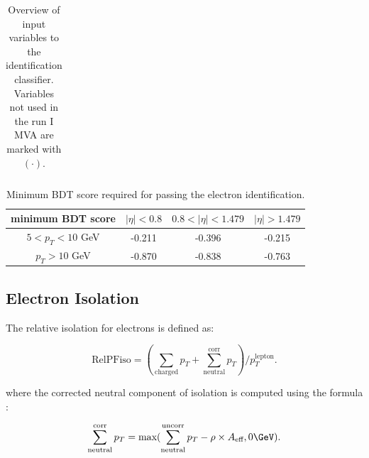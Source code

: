 \begin{table}[h!]
{\begin{tabular}{c|l}
\hline %
\hline %
     \end{tabular}}
    \caption{Overview of input variables to the identification classifier. Variables not used in the run I MVA are marked with  $(\mathord{\cdot})$.}
    \label{tab:ele_ID_input_variables}
\end{table}


\begin{table}[h!]
\scriptsize
    \centering
    \begin{tabular}{c|c c c}
\hline %
minimum BDT score    &  $|\eta| < 0.8 $ & $0.8 < |\eta| < 1.479$ 	& $|\eta| > 1.479$      \\
\hline %
$ 5 < p_T < 10 $ GeV &  -0.211      & -0.396  		& -0.215		\\
$p_T > 10$ GeV       &  -0.870		& -0.838		& -0.763		\\
\hline %
\hline %
     \end{tabular}
\small
    \caption{Minimum BDT score required for passing the electron identification.}
    \label{tab:ele_ID_WP}
\end{table}


\subsection{Electron Isolation}
\label{sec:eleiso}

The relative isolation for electrons is defined as: 

\begin{equation}
\text{RelPFiso} = (\sum_{\text{charged}} p_T + \sum^{\text{corr}}_{\text{neutral}} p_T)/p_T^{\text{lepton}}  .
\label{eqn:elepfrelisoeqn}
\end{equation} 

where the corrected neutral component of isolation is computed using the formula :

\begin{equation}
\label{eqn:neutralea}
  \sum^{\text{corr}}_{\text{neutral}} p_T = \text{max}(\sum^{\text{uncorr}}_{\text{neutral}} p_T - \rho \times A_\text{eff},0 \GeV)  .
\end{equation}

